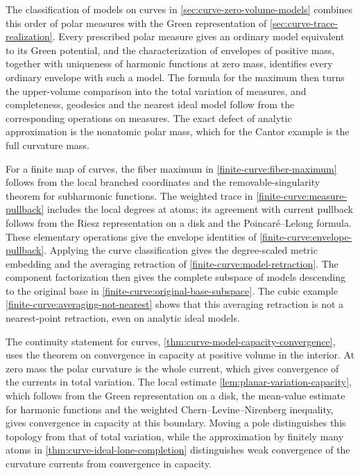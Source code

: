 The classification of models on curves in \cref{sec:curve-zero-volume-models} combines this order of polar measures with the Green representation of \cref{sec:curve-trace-realization}. Every prescribed polar measure gives an ordinary model equivalent to its Green potential, and the characterization of envelopes of positive mass, together with uniqueness of harmonic functions at zero mass, identifies every ordinary envelope with such a model. The formula for the maximum then turns the upper-volume comparison into the total variation of measures, and completeness, geodesics and the nearest ideal model follow from the corresponding operations on measures. The exact defect of analytic approximation is the nonatomic polar mass, which for the Cantor example is the full curvature mass.

For a finite map of curves, the fiber maximum in \cref{finite-curve:fiber-maximum} follows from the local branched coordinates and the removable-singularity theorem for subharmonic functions. The weighted trace in \cref{finite-curve:measure-pullback} includes the local degrees at atoms; its agreement with current pullback follows from the Riesz representation on a disk and the Poincar\'e--Lelong formula. These elementary operations give the envelope identities of \cref{finite-curve:envelope-pullback}. Applying the curve classification gives the degree-scaled metric embedding and the averaging retraction of \cref{finite-curve:model-retraction}. The component factorization then gives the complete subspace of models descending to the original base in \cref{finite-curve:original-base-subspace}. The cubic example \cref{finite-curve:averaging-not-nearest} shows that this averaging retraction is not a nearest-point retraction, even on analytic ideal models.

The continuity statement for curves, \cref{thm:curve-model-capacity-convergence}, uses the theorem on convergence in capacity at positive volume in the interior. At zero mass the polar curvature is the whole current, which gives convergence of the currents in total variation. The local estimate \cref{lem:planar-variation-capacity}, which follows from the Green representation on a disk, the mean-value estimate for harmonic functions and the weighted Chern--Levine--Nirenberg inequality, gives convergence in capacity at this boundary. Moving a pole distinguishes this topology from that of total variation, while the approximation by finitely many atoms in \cref{thm:curve-ideal-lone-completion} distinguishes weak convergence of the curvature currents from convergence in capacity.

